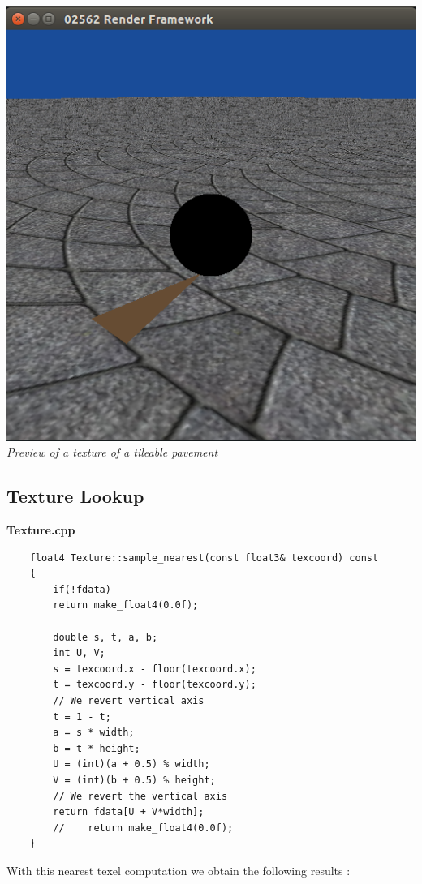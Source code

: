 \documentclass[a4,12pt]{article}
\begin{document}
\begin{center}
\begin{minipage}[b]{0.40\linewidth}
\begin{center}
			\includegraphics[width =\textwidth]{./Worksheet3/PavementPreview.png}\\
			\textit{Preview of a texture of a tileable pavement}
		\end{center}
	\end{minipage}
	\end{center}
	
	\subsection{Texture Lookup}
	\textbf{Texture.cpp}
	\begin{lstlisting}
	float4 Texture::sample_nearest(const float3& texcoord) const
	{
		if(!fdata)
		return make_float4(0.0f);
		
		double s, t, a, b;
		int U, V;
		s = texcoord.x - floor(texcoord.x);
		t = texcoord.y - floor(texcoord.y);
		// We revert vertical axis
		t = 1 - t;
		a = s * width;
		b = t * height;
		U = (int)(a + 0.5) % width;
		V = (int)(b + 0.5) % height;
		// We revert the vertical axis
		return fdata[U + V*width];
		//    return make_float4(0.0f);
	}
	\end{lstlisting}
	
	With this nearest texel computation we obtain the following results :
	
\end{document}
